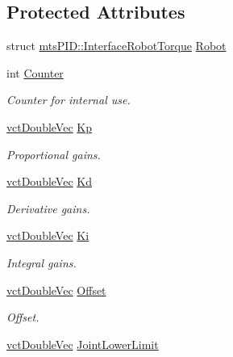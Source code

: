 \subsection*{Protected Attributes}
\begin{DoxyCompactItemize}
\item 
struct \hyperlink{structmts_p_i_d_1_1_interface_robot_torque}{mts\-P\-I\-D\-::\-Interface\-Robot\-Torque} \hyperlink{classmts_p_i_d_a17e9ab759f0051e59244d3a211ba6791}{Robot}
\item 
int \hyperlink{classmts_p_i_d_a7a1c2963d1d2b65a210464b9ef0d775f}{Counter}
\begin{DoxyCompactList}\small\item\em Counter for internal use. \end{DoxyCompactList}\item 
\hyperlink{vct_dynamic_vector_types_8h_ade4b3068c86fb88f41af2e5187e491c2}{vct\-Double\-Vec} \hyperlink{classmts_p_i_d_a0aa502158f417e137495a5c2ded4c5d0}{Kp}
\begin{DoxyCompactList}\small\item\em Proportional gains. \end{DoxyCompactList}\item 
\hyperlink{vct_dynamic_vector_types_8h_ade4b3068c86fb88f41af2e5187e491c2}{vct\-Double\-Vec} \hyperlink{classmts_p_i_d_a4d288bb566a2c45834c1f028cad03b3f}{Kd}
\begin{DoxyCompactList}\small\item\em Derivative gains. \end{DoxyCompactList}\item 
\hyperlink{vct_dynamic_vector_types_8h_ade4b3068c86fb88f41af2e5187e491c2}{vct\-Double\-Vec} \hyperlink{classmts_p_i_d_a979243fca1ea255c49b241658246d964}{Ki}
\begin{DoxyCompactList}\small\item\em Integral gains. \end{DoxyCompactList}\item 
\hyperlink{vct_dynamic_vector_types_8h_ade4b3068c86fb88f41af2e5187e491c2}{vct\-Double\-Vec} \hyperlink{classmts_p_i_d_a34993725f4bc1309971924b62549376c}{Offset}
\begin{DoxyCompactList}\small\item\em Offset. \end{DoxyCompactList}\item 
\hyperlink{vct_dynamic_vector_types_8h_ade4b3068c86fb88f41af2e5187e491c2}{vct\-Double\-Vec} \hyperlink{classmts_p_i_d_a4156fdfac35c3175ad1731dbcdcba8f2}{Joint\-Lower\-Limit}

\end{DoxyCompactItemize}
